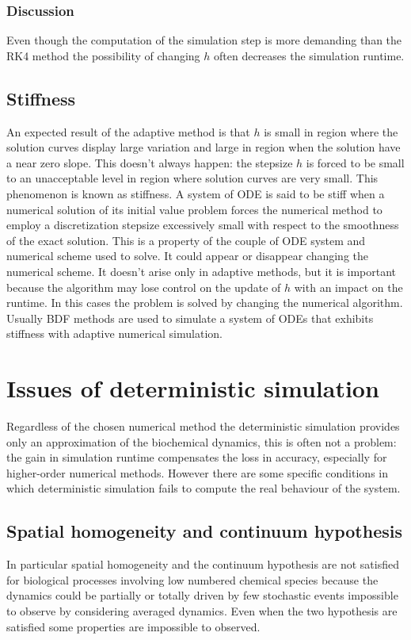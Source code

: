     

    \subsubsection{Discussion}
    Even though the computation of the simulation step is more demanding than the RK4 method the possibility of changing $h$ often decreases the simulation runtime.

  \subsection{Stiffness}
  An expected result of the adaptive method is that $h$ is small in region where the solution curves display large variation and large in region when the solution have a near zero slope.
  This doesn't always happen: the stepsize $h$ is forced to be small to an unacceptable level in region where solution curves are very small.
  This phenomenon is known as stiffness.
  A system of ODE is said to be stiff when a numerical solution of its initial value problem forces the numerical method to employ a discretization stepsize excessively small with respect to the smoothness of the exact solution.
  This is a property of the couple of ODE system and numerical scheme used to solve.
  It could appear or disappear changing the numerical scheme.
  It doesn't arise only in adaptive methods, but it is important because the algorithm may lose control on the update of $h$ with an impact on the runtime.
  In this cases the problem is solved by changing the numerical algorithm.
  Usually BDF methods are used to simulate a system of ODEs that exhibits stiffness with adaptive numerical simulation.

\section{Issues of deterministic simulation}
Regardless of the chosen numerical method the deterministic simulation provides only an approximation of the biochemical dynamics, this is often not a problem: the gain in simulation runtime compensates the loss in accuracy, especially for higher-order numerical methods.
However there are some specific conditions in which deterministic simulation fails to compute the real behaviour of the system.

  \subsection{Spatial homogeneity and continuum hypothesis}
  In particular spatial homogeneity and the continuum hypothesis are not satisfied for biological processes involving low numbered chemical species because the dynamics could be partially or totally driven by few stochastic events impossible to observe by considering averaged dynamics.
  Even when the two hypothesis are satisfied some properties are impossible to observed.

